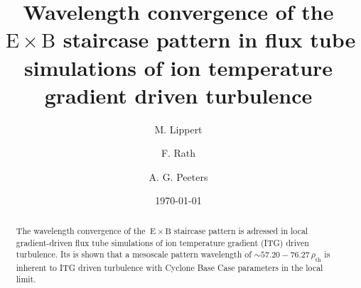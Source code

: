 \documentclass[aip, amsmath, amssymb, reprint, twocolumn]{revtex4-1}
\newcommand{\exb}{\mathrm{\:E}\times\mathrm{B}}
\newcommand{\rhoth}{\rho_\mathrm{th}}
\begin{document}

\title[Wavelength convergence of the $\exb$ staircase pattern in flux tube simulations of ion temperature gradient driven turbulence]
{Wavelength convergence of the $\exb$ staircase pattern in flux tube simulations of ion temperature gradient driven turbulence}

\author{M. Lippert}
\author{F. Rath}
\author{A. G. Peeters}

\date{\today}


\begin{abstract}
    The wavelength convergence of the $\exb$ staircase pattern is adressed in local gradient-driven flux tube simulations of ion temperature gradient (ITG) driven turbulence.
    Its is shown that a mesoscale pattern wavelength of \linebreak $\sim 57.20-76.27\,\rhoth$ is inherent to ITG driven turbulence with Cyclone Base Case parameters in the local limit. 
    
\end{abstract}

\maketitle



\end{document}
